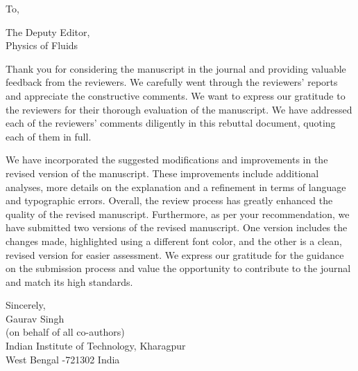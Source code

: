 \documentclass[onecolumn,a4paper,amsmath,amssym,pre]{revtex4}
\begin{document}
				To,
				
				The Deputy Editor,\\ 
				Physics of Fluids\\
				\par\null\par
				
				Thank you for considering the manuscript in the journal and providing valuable feedback from the reviewers. We carefully went through the reviewers' reports and appreciate the constructive comments. We want to express our gratitude to the reviewers for their thorough evaluation of the manuscript. We have addressed each of the reviewers' comments diligently in this rebuttal document, quoting each of them in full.
				\par\null\par
				We have incorporated the suggested modifications and improvements in the revised version of the manuscript. These improvements include additional analyses, more details on the explanation and a refinement in terms of  language and typographic errors. Overall, the review process has greatly enhanced the quality of the revised manuscript.	Furthermore, as per your recommendation, we have submitted two versions of the revised manuscript. One version includes the changes made, highlighted using a different font color, and the other is a clean, revised version for easier assessment.
				We express our gratitude for the guidance on the submission process and value the opportunity to contribute to the journal and match its high standards.\\
				\par\null\par
				\par\null\par
				Sincerely,\\
				
				Gaurav Singh\\
				(on behalf of all co-authors)\\
				Indian Institute of Technology, Kharagpur\\
				West Bengal -721302
				India
				\newpage								
\end{document}
